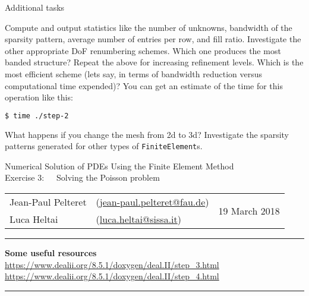 \documentclass[11pt,answers]{exam}
\makeatletter
\newcommand{\makeheader}[3]{%
\setcounter{question}{0}
\begin{center}
{\sc Numerical Solution of PDEs Using the Finite Element Method}\vspace{2ex}\\
{\sc Exercise #1:\ \ \ #2}\vspace{2ex}\\
\begin{tabular*}{\textwidth}{ll @{\extracolsep{\fill}}r}
Jean-Paul Pelteret & (\url{jean-paul.pelteret@fau.de}) & \multirow{2}{*}{#3} \\
Luca Heltai & (\url{luca.heltai@sissa.it}) & \\
\end{tabular*}
\end{center}
}
\newcommand{\makeresources}[1]{%
\rule{\textwidth}{0.6mm}
\textbf{Some useful resources}\\[1.5ex]
#1 \par
\rule{\textwidth}{0.6mm}
}
\makeatother
\begin{document}
\begin{questions}

\question Additional tasks
\begin{parts}
\bonuspart Compute and output statistics like the number of unknowns, bandwidth of the sparsity pattern, average number of entries per row, and fill ratio.
\bonuspart Investigate the other appropriate DoF renumbering schemes. Which one produces the most banded structure?
\bonuspart Repeat the above for increasing refinement levels. Which is the most efficient scheme (lets say, in terms of bandwidth reduction versus computational time expended)?  You can get an estimate of the time for this operation like this:
\begin{lstlisting}[language=bash]
$ time ./step-2
\end{lstlisting}
\bonuspart What happens if you change the mesh from 2d to 3d?
\bonuspart Investigate the sparsity patterns generated for other types of \verb|FiniteElement|s.
\end{parts}

\end{questions}




\clearpage
\makeheader{3}{Solving the Poisson problem}{19 March 2018}
\makeresources{%
\url{https://www.dealii.org/8.5.1/doxygen/deal.II/step_3.html} \\
\url{https://www.dealii.org/8.5.1/doxygen/deal.II/step_4.html}
}
\end{document}

